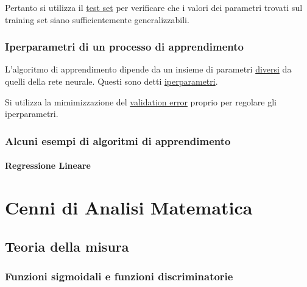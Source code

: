 \documentclass[10pt]{book}
\newcommand{\1}{\mathds{1}}
\theoremstyle{definition}%
\theoremstyle{plain}
\theoremstyle{remark}
\begin{document}
Pertanto si utilizza il \uline{test set} per verificare che i valori dei parametri trovati sul training set siano sufficientemente generalizzabili.
\subsection{Iperparametri di un processo di apprendimento}
\label{sec:orgbc1a321}
L'algoritmo di apprendimento dipende da un insieme di parametri \uline{diversi} da quelli della rete neurale. Questi sono detti \uline{iperparametri}.

Si utilizza la mimimizzazione del \uline{validation error} proprio per regolare gli iperparametri.
\subsection{Alcuni esempi di algoritmi di apprendimento}
\label{sec:orgfe6c818}

\subsubsection{Regressione Lineare}
\label{sec:org55684e9}
\chapter{Cenni di Analisi Matematica}
\label{sec:orgac88548}

\section{Teoria della misura}
\label{sec:org8d2c1e8}

\subsection{Funzioni sigmoidali e funzioni discriminatorie}
\label{sec:org11c5e90}
\end{document}
